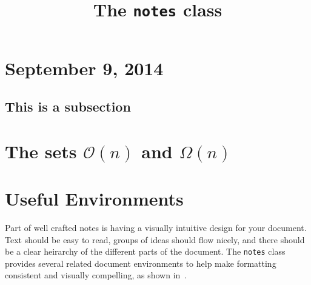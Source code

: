 \documentclass{notes}
\title{The \texttt{notes} class}
\begin{document}
	\section{September 9, 2014}
	\kant[1]
	\subsection{This is a subsection}
	\kant[2-4]
	\section{The sets $\mathcal{O}(n)$ and $\Omega(n)$}
	\kant[5-7]
	
	\section{Useful Environments}
	Part of well crafted notes is having a visually intuitive design for your document.
	Text should be easy to read, groups of ideas should flow nicely, and there should be a clear heirarchy of the different parts of the document.
	The \texttt{notes} class provides several related document environments to help make formatting consistent and visually compelling, as shown in~\cite{greenwade93}.
\end{document}
